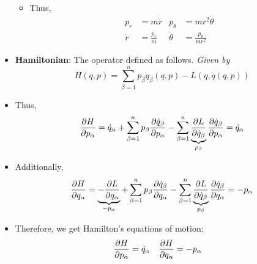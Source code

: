 \documentclass[../notes.tex]{subfiles}
\begin{document}
\begin{itemize}
\begin{itemize}
\begin{equation*}
        \end{equation*}
        \item Thus,
        \begin{align*}
            p_r &= m\dot{r}&
                p_\theta &= mr^2\dot{\theta}\\
            \dot{r} &= \frac{p_r}{m}&
                \dot{\theta} &= \frac{p_\theta}{mr^2}
        \end{align*}
    \end{itemize}
    \item \textbf{Hamiltonian}: The operator defined as follows. \emph{Given by}
    \begin{equation*}
        H(q,p) = \sum_{\beta=1}^np_\beta\dot{q}_\beta(q,p)-L(q,\dot{q}(q,p))
    \end{equation*}
    \item Thus,
    \begin{equation*}
        \pdv{H}{p_\alpha} = \dot{q}_\alpha+\sum_{\beta=1}^np_\beta\pdv{\dot{q}_\beta}{p_\alpha}-\sum_{\beta=1}^n\underbrace{\pdv{L}{\dot{q}_\beta}}_{p_\beta}\pdv{\dot{q}_\beta}{p_\alpha}
        = \dot{q}_\alpha
    \end{equation*}
    \item Additionally,
    \begin{equation*}
        \pdv{H}{q_\alpha} = \underbrace{-\pdv{L}{q_\alpha}}_{-p_\alpha}+\sum_{\beta=1}^np_\beta\pdv{\dot{q}_\beta}{q_\alpha}-\sum_{\beta=1}^n\underbrace{\pdv{L}{\dot{q}_\beta}}_{p_\beta}\pdv{\dot{q}_\beta}{q_\alpha}
        = -p_\alpha
    \end{equation*}
    \item Therefore, we get Hamilton's equations of motion:
    \begin{align*}
        \pdv{H}{p_\alpha} &= \dot{q}_\alpha&
        \pdv{H}{q_\alpha} &= -p_\alpha
    \end{align*}
\end{itemize}
\end{document}
